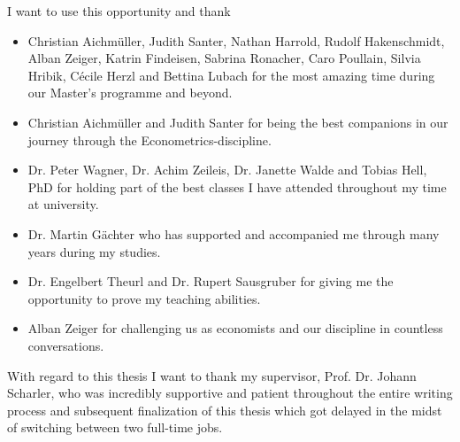 \documentclass[a4paper,11pt,listof=nochaptergap,oneside,pointednumbers,bibtotoc,bigheadings,liststotoc,hidelinks]{scrbook}
\theoremstyle{mysatz}
\theoremstyle{mydefinition}
\theoremstyle{mytheorem}
\theoremstyle{mybemerkung}
\begin{document}





\newpage
\thispagestyle{empty} %
I want to use this opportunity and thank
\begin{itemize}
	\item Christian Aichmüller, Judith Santer, Nathan Harrold, Rudolf Hakenschmidt, Alban Zeiger, Katrin Findeisen, Sabrina Ronacher, Caro Poullain, Silvia Hribik, Cécile Herzl and Bettina Lubach for the most amazing time during our Master's programme and beyond.
	\item Christian Aichmüller and Judith Santer for being the best companions in our journey through the Econometrics-discipline.
	\item Dr. Peter Wagner, Dr. Achim Zeileis, Dr. Janette Walde and Tobias Hell, PhD for holding part of the best classes I have attended throughout my time at university.
	\item Dr. Martin Gächter who has supported and accompanied me through many years during my studies.	
	\item Dr. Engelbert Theurl and Dr. Rupert Sausgruber for giving me the opportunity to prove my teaching abilities.
	\item Alban Zeiger for challenging us as economists and our discipline in countless conversations.
\end{itemize}

With regard to this thesis I want to thank my supervisor, Prof. Dr. Johann Scharler, who was incredibly supportive and patient throughout the entire writing process and subsequent finalization of this thesis which got delayed in the midst of switching between two full-time jobs.
\end{document}

